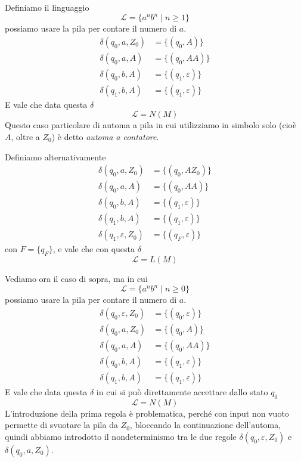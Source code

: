 \documentclass[12pt]{report}
\theoremstyle{definition}
\begin{document}
\begin{tcolorbox}
	Definiamo il linguaggio
	$$ \mathcal{L} = \{ a^n b^n \mid n \geq 1 \} $$
	possiamo usare la pila per contare il numero di $a$.
	\begin{align*}
		\delta(q_0, a, Z_0) &= \{(q_0, A)\} \\
		\delta(q_0, a, A)   &= \{(q_0, AA) \} \\
		\delta(q_0, b, A)   &= \{ (q_1, \varepsilon) \} \\
		\delta(q_1, b, A)   &= \{ (q_1, \varepsilon) \} 
	\end{align*}
	E vale che data questa $\delta$
	$$ \mathcal{L} = N(M) $$
	Questo caso particolare di automa a pila in cui utilizziamo in simbolo solo (cioè $A$, oltre a $Z_0$) è detto \textit{automa a contatore}.

	Definiamo alternativamente
	\begin{align*}
		\delta(q_0, a, Z_0) &= \{(q_0, AZ_0)\} \\
		\delta(q_0, a, A)   &= \{(q_0, AA)\} \\
		\delta(q_0, b, A)   &= \{(q_1, \varepsilon)\} \\
		\delta(q_1, b, A)   &= \{(q_1, \varepsilon)\} \\
		\delta(q_1, \varepsilon, Z_0) &= \{(q_F, \varepsilon)\}
	\end{align*}
	con $F = \{q_F\}$, e vale che con questa $\delta$
	$$ \mathcal{L} = L(M) $$

	Vediamo ora il caso di sopra, ma in cui
	$$ \mathcal{L} = \{ a^n b^n \mid n \geq 0 \} $$
	possiamo usare la pila per contare il numero di $a$.
	\begin{align*}
		\delta(q_0, \varepsilon, Z_0) &= \{(q_0, \varepsilon)\} \\
		\delta(q_0, a, Z_0) &= \{(q_0, A)\} \\
		\delta(q_0, a, A)   &= \{(q_0, AA) \} \\
		\delta(q_0, b, A)   &= \{ (q_1, \varepsilon) \} \\
		\delta(q_1, b, A)   &= \{ (q_1, \varepsilon) \} 
	\end{align*}
	E vale che data questa $\delta$ in cui si può direttamente accettare dallo stato $q_0$
	$$ \mathcal{L} = N(M) $$
	L'introduzione della prima regola è problematica, perché con input non vuoto permette di svuotare la pila da $Z_0$, bloccando la continuazione dell'automa, quindi abbiamo introdotto il nondeterminismo tra le due regole $\delta(q_0, \varepsilon, Z_0)$ e $\delta(q_0, a, Z_0)$.


\end{tcolorbox}
\end{document}
